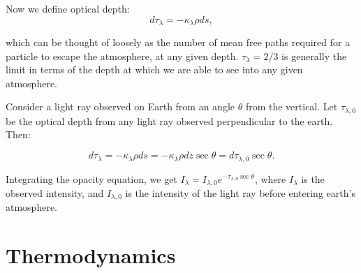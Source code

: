 \documentclass[12pt]{article}
\begin{document}
Now we define optical depth:
\[d\tau_{\lambda} = -\kappa_{\lambda}\rho ds,\]

which can be thought of loosely as the number of mean free paths required for a particle to escape the atmosphere, at any given depth. $\tau_{\lambda} = 2/3$ is generally the limit in terms of the depth at which we are able to see into any given atmosphere.

Consider a light ray observed on Earth from an angle $\theta$ from the vertical. Let $\tau_{\lambda, 0}$ be the optical depth from any light ray observed perpendicular to the earth. Then: 

\[d\tau_{\lambda} = -\kappa_{\lambda}\rho ds = -\kappa_{\lambda}\rho dz \sec{\theta} = d\tau_{\lambda, 0}\sec{\theta}.\]

Integrating the opacity equation, we get 
$I_{\lambda} = I_{\lambda,0}e^{-\tau_{\lambda, 0}\sec{\theta}}$, where $I_{\lambda}$ is the observed intensity, and $I_{\lambda,0}$ is the intensity of the light ray before entering earth's atmosphere.

\newpage
\section{Thermodynamics}
\end{document}
